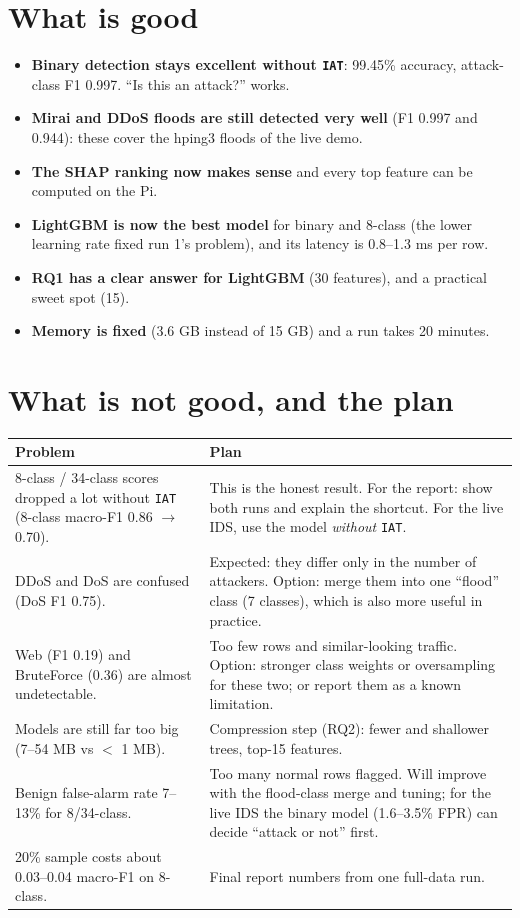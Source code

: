 \documentclass[11pt]{article}
\begin{document}
\section{What is good}
\begin{itemize}
\item \textbf{Binary detection stays excellent without \texttt{IAT}}: 99.45\% accuracy, attack-class F1 0.997. ``Is this an attack?'' works.
\item \textbf{Mirai and DDoS floods are still detected very well} (F1 0.997 and 0.944): these cover the hping3 floods of the live demo.
\item \textbf{The SHAP ranking now makes sense} and every top feature can be computed on the Pi.
\item \textbf{LightGBM is now the best model} for binary and 8-class (the lower learning rate fixed run 1's problem), and its latency is 0.8--1.3 ms per row.
\item \textbf{RQ1 has a clear answer for LightGBM} (30 features), and a practical sweet spot (15).
\item \textbf{Memory is fixed} (3.6 GB instead of 15 GB) and a run takes 20 minutes.
\end{itemize}

\section{What is not good, and the plan}
\begin{longtable}{@{}>{\raggedright}p{6cm} >{\raggedright\arraybackslash}p{10cm}@{}}
\toprule
\textbf{Problem} & \textbf{Plan} \\
\midrule
\endhead
8-class / 34-class scores dropped a lot without \texttt{IAT} (8-class macro-F1 0.86 $\rightarrow$ 0.70). &
This is the honest result. For the report: show both runs and explain the shortcut. For the live IDS, use the model \emph{without} \texttt{IAT}. \\
DDoS and DoS are confused (DoS F1 0.75). &
Expected: they differ only in the number of attackers. Option: merge them into one ``flood'' class (7 classes), which is also more useful in practice. \\
Web (F1 0.19) and BruteForce (0.36) are almost undetectable. &
Too few rows and similar-looking traffic. Option: stronger class weights or oversampling for these two; or report them as a known limitation. \\
Models are still far too big (7--54 MB vs $<$ 1 MB). &
Compression step (RQ2): fewer and shallower trees, top-15 features. \\
Benign false-alarm rate 7--13\% for 8/34-class. &
Too many normal rows flagged. Will improve with the flood-class merge and tuning; for the live IDS the binary model (1.6--3.5\% FPR) can decide ``attack or not'' first. \\
20\% sample costs about 0.03--0.04 macro-F1 on 8-class. & Final report numbers from one full-data run. \\
\bottomrule
\end{longtable}
\end{document}
